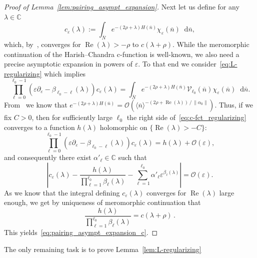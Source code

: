 \documentclass[10pt]{amsart}
\theoremstyle{definition}
\DeclareMathOperator{\Real}{Re}
\newcommand{\mc}{\mathcal}
\newcommand{\cc}{\mathbb{C}}
\newcommand{\intd}{\mathop{}\!\mathrm{d}}
\newcommand{\bn}{{\overline{n}}}
\newcommand{\bN}{{\overline{N}}}
\begin{document}
\begin{proof}[Proof of Lemma~\ref{lem:pairing_asympt_expansion}]
Next let us define for any $\lambda\in\cc$
\[
c_\varepsilon(\lambda) := \int_{\bN} e^{-(2\rho+\lambda)H(\bn)} \chi_\varepsilon(\bn)
\intd\bn,
\]
which, by~\cite[Chapter IV.6]{Hel84}, converges for $\Real(\lambda)>-\rho$ to $c(\lambda+\rho)$. While the meromorphic continuation of the Harish--Chandra c-function is well-known, we also need a precise asymptotic expansion in powers of $\varepsilon$. To that end we consider~\eqref{eq:L-regularizing} which implies
\begin{equation}\label{eq:c-fct_regularizing}
\prod_{\ell=0}^{\ell_0-1} (\varepsilon\partial_\varepsilon - \beta_{\ell_0-\ell}(\lambda))c_\varepsilon(\lambda) = \int_{\bN} e^{-(2\rho+\lambda)H(\bn)} \mathcal V_{\ell_0}(\bn)\chi_\varepsilon(\bn)\intd\bn.
\end{equation}
From~\cite[Theorem~IX.3.8]{Hel78} we know that $e^{-(2\rho+\lambda)H(\bn)} = \mc O(\langle\bn\rangle^{-(2\rho+\Real(\lambda))\,/\,\|\alpha_0\|})$. Thus, if we fix $C>0$, then for sufficiently large $\ell_0$ the right side of~\eqref{eq:c-fct_regularizing} converges to a function $h(\lambda)$ holomorphic on $\{\Real(\lambda) >-C\}$:
\[
\prod_{\ell=0}^{\ell_0-1} (\varepsilon\partial_\varepsilon - \beta_{\ell_0-\ell}(\lambda))c_\varepsilon(\lambda) = h(\lambda) +\mc{O}(\varepsilon),
\]
and consequently there exist $\alpha'_\ell\in\cc$ such that
\[
\left|c_\varepsilon(\lambda) -
\frac{h(\lambda)}{\displaystyle{\prod_{\ell = 1}^{\ell_0}} \beta_\ell(\lambda)} -\sum_{\ell=1}^{\ell_0} \alpha'_\ell \varepsilon^{\beta_\ell(\lambda)}\right| = \mc{O}(\varepsilon).
\]
As we know that the integral defining $c_\varepsilon(\lambda)$ converges for $\Real(\lambda)$ large enough, we get by uniqueness of meromorphic continuation that
\[
\frac{h(\lambda)}{\displaystyle{\prod_{\ell = 1}^{\ell_0}} \beta_\ell(\lambda)} = c(\lambda+\rho)\,.
\]
This yields~\eqref{eq:pairing_asympt_expansion_c}.
\end{proof}

The only remaining task is to prove Lemma~\ref{lem:L-regularizing}
\end{document}
